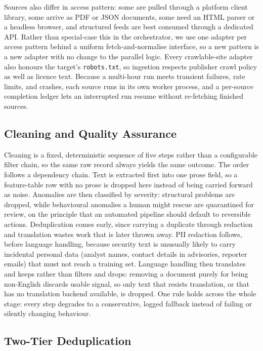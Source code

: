 \documentclass[conference]{IEEEtran}
\begin{document}
Sources also differ in access pattern: some are pulled through a
platform client library, some arrive as PDF or JSON documents, some
need an HTML parser or a headless browser, and structured feeds are
best consumed through a dedicated API. Rather than special-case this in
the orchestrator, we use one adapter per access pattern behind a
uniform fetch-and-normalise interface, so a new pattern is a new
adapter with no change to the parallel logic. Every crawlable-site
adapter also honours the target's \texttt{robots.txt}, so ingestion
respects publisher crawl policy as well as licence text. Because a
multi-hour run meets transient failures, rate limits, and crashes, each
source runs in its own worker process, and a per-source completion
ledger lets an interrupted run resume without re-fetching finished
sources.

\subsection{Cleaning and Quality Assurance}

Cleaning is a fixed, deterministic sequence of five steps rather than a
configurable filter chain, so the same raw record always yields the
same outcome. The order follows a dependency chain. Text is extracted
first into one prose field, so a feature-table row with no prose is
dropped here instead of being carried forward as noise. Anomalies are
then classified by severity: structural problems are dropped, while
behavioural anomalies a human might rescue are quarantined for review,
on the principle that an automated pipeline should default to
reversible actions. Deduplication comes early, since carrying a
duplicate through redaction and translation wastes work that is later
thrown away. PII redaction follows, before language handling, because
security text is unusually likely to carry incidental personal data
(analyst names, contact details in advisories, reporter emails) that
must not reach a training set. Language handling then translates and
keeps rather than filters and drops: removing a document purely for
being non-English discards usable signal, so only text that resists
translation, or that has no translation backend available, is dropped.
One rule holds across the whole stage: every step degrades to a
conservative, logged fallback instead of failing or silently changing
behaviour.

\subsection{Two-Tier Deduplication}
\end{document}

